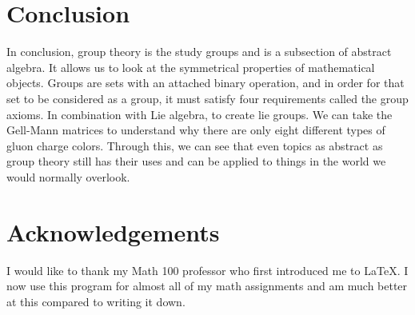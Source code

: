 \documentclass[12pt,journal,compsoc]{IEEEtran}
\begin{document}
\section{Conclusion}
In conclusion, group theory is the study groups and is a subsection of abstract
algebra. It allows us to look at the symmetrical properties of mathematical
objects. Groups are sets with an attached binary operation, and in order for
that set to be considered as a group, it must satisfy four requirements called
the group axioms. In combination with Lie algebra, to create lie groups. We can take the Gell-Mann matrices to understand why there are only eight different types of gluon charge colors. Through this, we can see that even topics as abstract as group theory still has their uses and can be applied to things in the world we would normally overlook.
\section*{Acknowledgements}
I would like to thank my Math 100 professor who first introduced me to LaTeX. I now use this program for almost all of my math assignments and am much better at this compared to writing it down.





\end{document}
